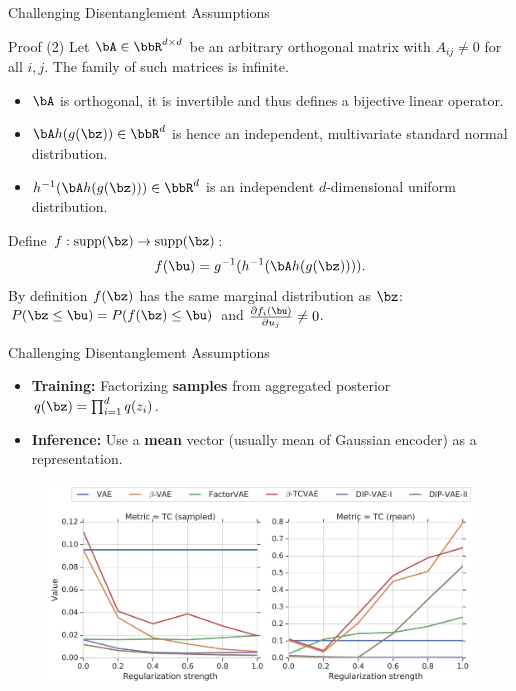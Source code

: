 \begin{frame}{Challenging Disentanglement Assumptions}
	\begin{block}{Proof (2)}
		Let $\bA \in \bbR^{d \times d}$ be an arbitrary orthogonal matrix with $A_{ij} \neq 0$ for all $i, j$.
		The family of such matrices is infinite.
		\begin{itemize}
			\item $\bA$ is orthogonal, it is invertible and thus defines a bijective linear operator. 
			\item $\bA h(g(\bz)) \in \bbR^d$ is hence an independent, multivariate standard normal distribution.
			\item $h^{-1}( \bA h(g(\bz))) \in \bbR^d$ is an independent $d$-dimensional uniform distribution.
		\end{itemize}
		Define $f: \text{supp}(\bz) \rightarrow \text{supp}(\bz)$:
		\[
			f(\bu) = g^{-1} (h^{-1}( \bA h(g(\bz)))).
		\]
		By definition $f(\bz)$ has the same marginal distribution as $\bz$: $P(\bz \leq \bu) = P(f(\bz) \leq \bu)$ and $\frac{\partial f_i(\bu)}{\partial u_j} \neq 0$.
		\end{block}

\end{frame}
\begin{frame}{Challenging Disentanglement Assumptions}
	\begin{itemize}
		\item \textbf{Training:} Factorizing \textbf{samples} from aggregated posterior $q(\bz) = \prod_{i=1}^d q(z_i)$.
		\item \textbf{Inference:} Use a \textbf{mean} vector (usually mean of Gaussian encoder) as a representation.
	\end{itemize}
	\begin{figure}
		\centering
		\includegraphics[width=0.95\linewidth]{figs/challenge_dis_1}
	\end{figure}

\end{frame}
